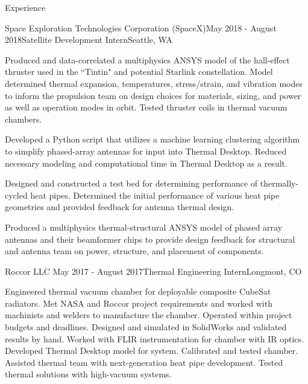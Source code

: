 \documentclass{resume} %
\begin{document}

\begin{rSection}{Experience}


	\begin{rSubsection}{Space Exploration Technologies Corporation (SpaceX)}{May 2018 - August 2018}{Satellite Development Intern}{Seattle, WA}
	\item {\small Produced and data-correlated a multiphysics ANSYS model of the hall-effect thruster used in the ``Tintin" and potential Starlink constellation. Model determined thermal expansion, temperatures, stress/strain, and vibration modes to inform the propulsion team on design choices for materials, sizing, and power as well as operation modes in orbit. Tested thruster coils in thermal vacuum chambers.}
	\item{\small Developed a Python script that utilizes a machine learning clustering algorithm to simplify phased-array antennas for input into Thermal Desktop. Reduced necessary modeling and computational time in Thermal Desktop as a result.}
	\item{\small Designed and constructed a test bed for determining performance of thermally-cycled heat pipes. Determined the initial performance of various heat pipe geometries and provided feedback for antenna thermal design. }
	\item{\small Produced a multiphysics thermal-structural ANSYS model of phased array antennas and their beamformer chips to provide design feedback for structural and antenna team on power, structure, and placement of components.}
\end{rSubsection}


\begin{rSubsection}{Roccor LLC }{May 2017 - August 2017}{Thermal Engineering Intern}{Longmont, CO}
\item {\small Engineered thermal vacuum chamber for deployable composite CubeSat radiators. Met NASA and Roccor project requirements and worked with machinists and welders to manufacture the chamber. Operated within project budgets and deadlines. Designed and simulated in SolidWorks and validated results by hand. Worked with FLIR instrumentation for chamber with IR optics. Developed Thermal Desktop model for system. Calibrated and tested chamber. Assisted thermal team with next-generation heat pipe development. Tested thermal solutions with high-vacuum systems.}
\end{rSubsection}


\end{rSection}
\end{document}
